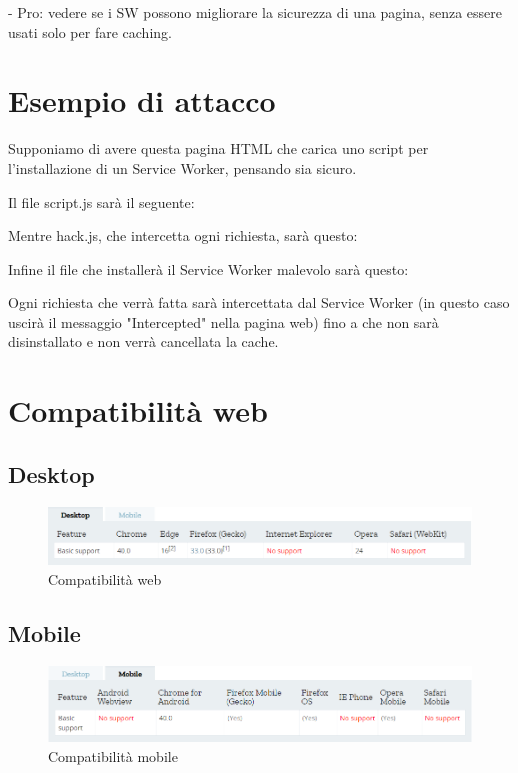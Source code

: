 \documentclass[11pt ,a4paper , twoside , openright ]{article}
\begin{document}
- Pro: vedere se i SW possono migliorare la sicurezza di una pagina, senza essere usati solo per fare caching.
\newpage
\section{Esempio di attacco}
Supponiamo di avere questa pagina HTML che carica uno script per l'installazione di un Service Worker, pensando sia sicuro.

Il file script.js sarà il seguente:

Mentre hack.js, che intercetta ogni richiesta, sarà questo:

Infine il file che installerà il Service Worker malevolo sarà questo:

Ogni richiesta che verrà fatta sarà intercettata dal Service Worker (in questo caso uscirà il messaggio "Intercepted" nella pagina web) fino a che non sarà disinstallato e non verrà cancellata la cache.
\newpage
\section{Compatibilità web}
\subsection{Desktop}
\begin{figure}[h]
	\centering
	\includegraphics[width=1\linewidth]{CompWeb}
	\caption{Compatibilità web}
	\label{fig:Compatibilità web}
\end{figure}
\subsection{Mobile}
\begin{figure}[h]
	\centering
	\includegraphics[width=1\linewidth]{CompMobile}
	\caption{Compatibilità mobile}
	\label{fig:Compatibilità mobile}
\end{figure}
\newpage
\end{document}
